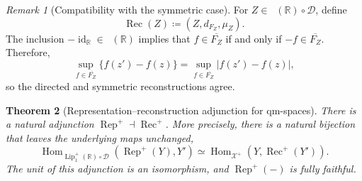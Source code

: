 \documentclass{amsart}
\theoremstyle{plain}
\newtheorem{theorem}{Theorem}[section]
\theoremstyle{definition}
\theoremstyle{remark}
\newtheorem{remark}[theorem]{Remark}
\newcommand{\R}{\mathbb{R}}
\newcommand{\D}{\mathcal{D}}
\newcommand{\Xp}{\mathcal{X}^{+}}
\newcommand{\Lup}{\operatorname{Lip}^{+}_{1}(\R)}
\DeclareMathOperator{\lipone}{Lip_1}
\begin{document}
\begin{remark}[Compatibility with the symmetric case]
\label{rem:symmetric-reconstruction-bridge}
For $Z\in\lipone(\R)\circ\D$, define
\[\operatorname{Rec}(Z)\coloneqq(Z,d_{F_Z},\mu_Z).\]
The inclusion $-\operatorname{id}_{\R}\in\lipone(\R)$ implies that $f\in\overline{F_Z}$ if and only if $-f\in\overline{F_Z}$. Therefore,
\[\sup_{f\in\overline{F_Z}}\{f(z')-f(z)\}=\sup_{f\in\overline{F_Z}}|f(z')-f(z)|,\]
so the directed and symmetric reconstructions agree.
\end{remark}

\begin{theorem}[Representation--reconstruction adjunction for qm-spaces]
\label{thm:adjunction-direction}
There is a natural adjunction $\operatorname{Rep}^{+}\dashv\operatorname{Rec}^{+}$. More precisely, there is a natural bijection that leaves the underlying maps unchanged,
\begin{equation}
\label{eq:hom-asymmetric}
\operatorname{Hom}_{\Lup\circ\D}(\operatorname{Rep}^{+}(Y),Y')\simeq\operatorname{Hom}_{\Xp}(Y,\operatorname{Rec}^{+}(Y')).
\end{equation}
The unit of this adjunction is an isomorphism, and $\operatorname{Rep}^{+}(-)$ is fully faithful.
\end{theorem}
\end{document}
